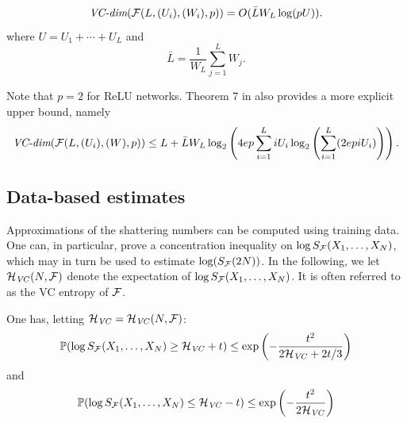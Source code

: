 \begin{theorem}
\label{th:vc.nn}
\[
\textit{VC-dim}({\mathcal F}(L,(U_i), (W_i), p)) = O(\bar L W_L \log(pU)).
\]
where $U = U_1 + \cdots + U_L$ and
\[
\bar L = \frac1{W_L} \sum_{j=1}^L W_j.
\]
\end{theorem}
Note that $p=2$ for ReLU networks. Theorem 7 in \citet{bartlett2019nearly} also provides a more explicit upper bound, namely
\[
\textit{VC-dim}({\mathcal F}(L,(U_i), (W), p)) \leq L + \bar L W_L \log_2\left(4ep \sum_{i=1}^L i U_i \log_2\left(\sum_{i=1}^L(2epi U_i)\right)\right).
\]

\subsection{Data-based estimates}
Approximations of the shattering numbers  can be computed using training
data. One can, in particular, prove a concentration inequality \citep{boucheron2000sharp} on $\log S_{\mathcal F}(X_1, \ldots, X_N)$, which may in turn be used to estimate $\log(S_{\mathcal F}(2N))$. In the following, we let
${\mathcal H}_{\mathit{VC}}(N, {\mathcal F})$ denote the expectation of $\log S_{\mathcal F}(X_1, \ldots, X_N)$. It is often referred to as the VC entropy of ${\mathcal F}$. 
\begin{theorem}
\label{th:vc.conc}
One has, letting ${\mathcal H}_{\mathit{VC}} = {\mathcal H}_{\mathit{VC}}(N, {\mathcal F})$:
\[
\bm{\mathbb P}(\log S_{\mathcal F}(X_1, \ldots, X_N) \geq {\mathcal H}_{\mathit{VC}} + t) \leq \exp\left(- \frac{t^2}{2{\mathcal H}_{\mathit{VC}} + 2t/3}\right)
\]
and
\[
\bm{\mathbb P}(\log S_{\mathcal F}(X_1, \ldots, X_N) \leq {\mathcal H}_{\mathit{VC}} - t) \leq \exp\left(- \frac{t^2}{2{\mathcal H}_{\mathit{VC}}}\right)
\]
\end{theorem}
